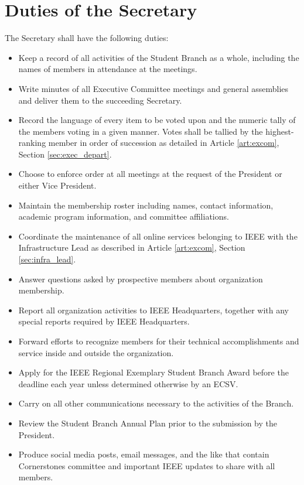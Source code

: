\documentclass[12pt]{constitution}
\begin{document}
\section{Duties of the Secretary}
\label{sec:officer_sec}
The Secretary shall have the following duties:
\begin{itemize}
    \item Keep a record of all activities of the Student Branch as a whole, including the names of members in attendance at the meetings.
    \item Write minutes of all Executive Committee meetings and general assemblies and deliver them to the succeeding Secretary.
    \item Record the language of every item to be voted upon and the numeric tally of the members voting in a given manner. Votes shall be tallied by the highest-ranking member in order of succession as detailed in Article \ref{art:excom}, Section \ref{sec:exec_depart}. 
    \item Choose to enforce order at all meetings at the request of the President or either Vice President.
    \item Maintain the membership roster including names, contact information, academic program information, and committee affiliations.
    \item Coordinate the maintenance of all online services belonging to IEEE with the Infrastructure Lead as described in Article \ref{art:excom}, Section \ref{sec:infra_lead}.
    \item Answer questions asked by prospective members about organization membership.
    \item Report all organization activities to IEEE Headquarters, together with any special reports required by IEEE Headquarters.
    \item Forward efforts to recognize members for their technical accomplishments and service inside and outside the organization.
    \item Apply for the IEEE Regional Exemplary Student Branch Award before the deadline each year unless determined otherwise by an ECSV.
    \item Carry on all other communications necessary to the activities of the Branch.
    \item Review the Student Branch Annual Plan prior to the submission by the President.
    \item Produce social media posts, email messages, and the like that contain Cornerstones committee and important IEEE updates to share with all members.
\end{itemize}
\end{document}
